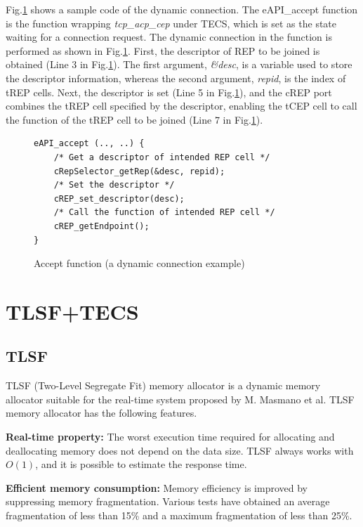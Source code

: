 \documentclass[a4j,12pt,oneside,openany,english]{jsbook}
\begin{document}
Fig.\ref{src:DynamicCcode} shows a sample code of the dynamic connection.
The eAPI\_accept function is the function wrapping {\it tcp\_acp\_cep} under TECS, which is set as the state waiting for a connection request.
The dynamic connection in the function is performed as shown in Fig.\ref{src:DynamicCcode}.
First, the descriptor of REP to be joined is obtained (Line 3 in Fig.\ref{src:DynamicCcode}).
The first argument, {\it \&desc}, is a variable used to store the descriptor information, whereas the second argument, {\it repid}, is the index of tREP cells.
Next, the descriptor is set (Line 5 in Fig.\ref{src:DynamicCcode}), and the cREP port combines the tREP cell specified by the descriptor, enabling the tCEP cell to call the function of the tREP cell to be joined (Line 7 in Fig.\ref{src:DynamicCcode}).

\begin{figure}[t]
\centering
\begin{lstlisting}
eAPI_accept (.., ..) {
    /* Get a descriptor of intended REP cell */
    cRepSelector_getRep(&desc, repid);
    /* Set the descriptor */
    cREP_set_descriptor(desc);
    /* Call the function of intended REP cell */
    cREP_getEndpoint();
}
\end{lstlisting}
\caption{Accept function (a dynamic connection example)}
\label{src:DynamicCcode}
\end{figure}


\section{TLSF+TECS}
\label{sec:TLSF+TECS}

\subsection{TLSF}

TLSF (Two-Level Segregate Fit) memory allocator\cite{par:TLSF}\cite{url:TLSF} is a dynamic memory allocator suitable for the real-time system proposed by M. Masmano et al.
TLSF memory allocator has the following features.

{\bf Real-time property:}
The worst execution time required for allocating and deallocating memory does not depend on the data size.
TLSF always works with $O(1)$, and it is possible to estimate the response time.

{\bf Efficient memory consumption:}
Memory efficiency is improved by suppressing memory fragmentation.
Various tests have obtained an average fragmentation of less than 15\% and a maximum fragmentation of less than 25\%.
\end{document}
